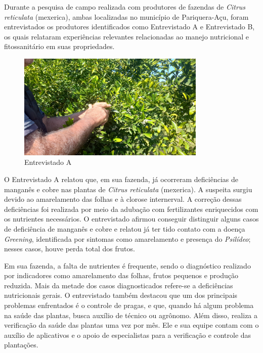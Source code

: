 \medskip
Durante a pesquisa de campo realizada com produtores de fazendas de 
\textit{Citrus reticulata} (mexerica), ambas localizadas no município de 
Pariquera-Açu, foram entrevistados os produtores identificados como Entrevistado 
A e Entrevistado B, os quais relataram experiências relevantes relacionadas ao 
manejo nutricional e fitossanitário em suas propriedades. 

\begin{figure}[H]
\centering
\caption{Entrevistado A  }%
\label{fig:Pesquisa-1}
\includegraphics[width=0.8\textwidth]{Images/PesquisaCampo1.jpg}
\end{figure}

\medskip
O Entrevistado A relatou que, em sua fazenda, já ocorreram deficiências de 
manganês e cobre nas plantas de \textit{Citrus reticulata} (mexerica). 
A suspeita surgiu devido ao amarelamento das folhas e à clorose internerval. 
A correção dessas deficiências foi realizada por meio da adubação com 
fertilizantes enriquecidos com os nutrientes necessários. O entrevistado 
afirmou conseguir distinguir alguns casos de deficiência de manganês e cobre 
e relatou já ter tido contato com a doença \textit{Greening}, identificada 
por sintomas como amarelamento e presença do \textit{Psilídeo}; nesses casos, 
houve perda total dos frutos. 

\medskip
Em sua fazenda, a falta de nutrientes é frequente, sendo o diagnóstico 
realizado por indicadores como amarelamento das folhas, frutos pequenos e 
produção reduzida. Mais da metade dos casos diagnosticados refere-se a deficiências 
nutricionais gerais. O entrevistado também destacou que um dos principais problemas 
enfrentados é o controle de pragas, e que, quando há algum problema na saúde das 
plantas, busca auxílio de técnico ou agrônomo. Além disso, realiza a verificação 
da saúde das plantas uma vez por mês. Ele e sua equipe contam com o auxílio de aplicativos 
e o apoio de especialistas para a verificação e controle das plantações. 

